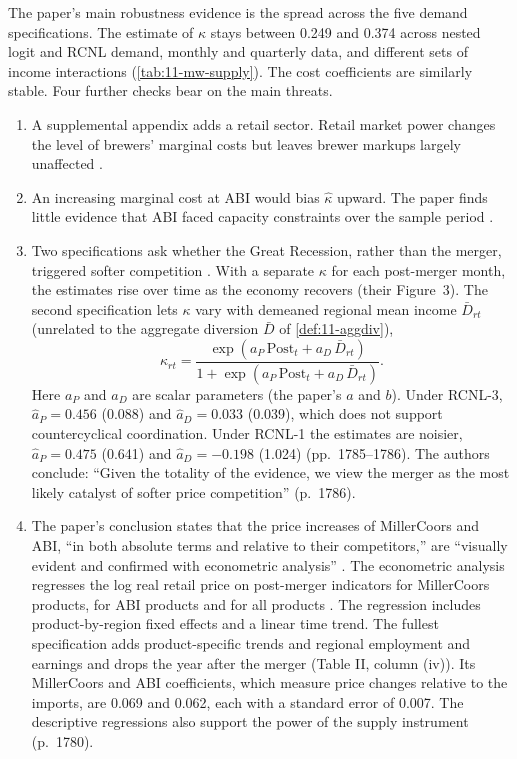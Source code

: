 The paper's main robustness evidence is the spread across the five demand specifications. The estimate of $\kappa$
stays between 0.249 and 0.374 across nested logit and RCNL demand, monthly and quarterly data, and different sets of
income interactions (\cref{tab:11-mw-supply}). The cost coefficients are similarly stable. Four further checks bear on
the main threats.
\begin{enumerate}[label=(\alph*)]
\item A supplemental appendix adds a retail sector. Retail market power changes the
level of brewers' marginal costs but leaves brewer markups largely unaffected \citep[n.~14]{MillerWeinberg2017}.
\item An increasing marginal cost at ABI would bias $\hat\kappa$ upward. The paper
finds little evidence that ABI faced capacity constraints over the sample period \citep[n.~13]{MillerWeinberg2017}.
\item Two specifications ask whether the Great Recession, rather than the merger, triggered softer competition
\citep[Section~5.4]{MillerWeinberg2017}. With a separate $\kappa$ for each post-merger month, the estimates rise over
time as the economy recovers (their Figure~3). The second specification lets $\kappa$ vary with demeaned regional mean
income $\bar D_{rt}$ (unrelated to the aggregate diversion $\bar D$ of \cref{def:11-aggdiv}),
\begin{equation*}
  \kappa_{rt} = \frac{\exp(a_P\,\text{Post}_t + a_D\,\bar D_{rt})}{1 + \exp(a_P\,\text{Post}_t + a_D\,\bar D_{rt})} .
\end{equation*}
Here $a_P$ and $a_D$ are scalar parameters (the paper's $a$ and $b$). Under RCNL-3, $\hat a_P = 0.456$ (0.088) and
$\hat a_D = 0.033$ (0.039), which does not support countercyclical coordination. Under RCNL-1 the estimates are
noisier, $\hat a_P = 0.475$ (0.641) and $\hat a_D = -0.198$ (1.024) (pp.~1785--1786). The authors conclude: ``Given the totality of the evidence, we view the merger as the most likely
catalyst of softer price competition'' (p.~1786).
\item The paper's conclusion states that the price increases of MillerCoors and ABI,
``in both absolute terms and relative to their competitors,'' are ``visually evident and confirmed with econometric
analysis'' \citep[p.~1788]{MillerWeinberg2017}. The econometric analysis regresses the log real retail price on
post-merger indicators for MillerCoors products, for ABI products and for all products \citep[eq.~(1)]{MillerWeinberg2017}.
The regression includes product-by-region fixed effects and a linear time trend. The fullest specification adds
product-specific trends and regional employment and earnings and drops the year after the merger (Table II, column (iv)).
Its MillerCoors and ABI coefficients, which measure price changes relative to the imports, are 0.069 and 0.062, each
with a standard error of 0.007. The descriptive regressions also support the power of the supply instrument
(p.~1780).
\end{enumerate}

